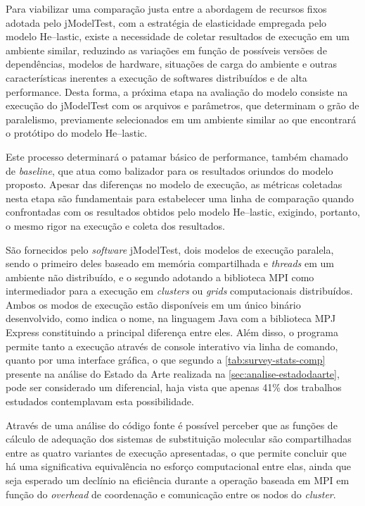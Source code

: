 \documentclass[english,brazilian]{UNISINOSmonografia} %
\begin{document}
Para viabilizar uma comparação justa entre a abordagem de recursos fixos adotada pelo jModelTest, com a estratégia de elasticidade empregada pelo modelo \textsf{He}--lastic, existe a necessidade de coletar resultados de execução em um ambiente similar, reduzindo as variações em função de possíveis versões de dependências, modelos de hardware, situações de carga do ambiente e outras características inerentes a execução de softwares distribuídos e de alta performance.
Desta forma, a próxima etapa na avaliação do modelo consiste na execução do jModelTest com os arquivos e parâmetros, que determinam o grão de paralelismo, previamente selecionados em um ambiente similar ao que encontrará o protótipo do modelo \textsf{He}--lastic.


Este processo determinará o patamar básico de performance, também chamado de \textit{baseline}, que atua como balizador para os resultados oriundos do modelo proposto.
Apesar das diferenças no modelo de execução, as métricas coletadas nesta etapa são fundamentais para estabelecer uma linha de comparação quando confrontadas com os resultados obtidos pelo modelo \textsf{He}--lastic, exigindo, portanto, o mesmo rigor na execução e coleta dos resultados.


São fornecidos pelo \textit{software} jModelTest, dois modelos de execução paralela, sendo o primeiro deles baseado em memória compartilhada e \textit{threads} em um ambiente não distribuído, e o segundo adotando a biblioteca MPI como intermediador para a execução em \textit{clusters} ou \textit{grids} computacionais distribuídos.
Ambos os modos de execução estão disponíveis em um único binário desenvolvido, como indica o nome, na linguagem Java com a biblioteca MPJ Express \cite{Baker2006} constituindo a principal diferença entre eles.
Além disso, o programa permite tanto a execução através de console interativo via linha de comando, quanto por uma interface gráfica, o que segundo a \autoref{tab:survey-stats-comp} presente na análise do Estado da Arte realizada na \autoref{sec:analise-estadodaarte}, pode ser considerado um diferencial, haja vista que apenas 41\% dos trabalhos estudados contemplavam esta possibilidade.


Através de uma análise do código fonte é possível perceber que as funções de cálculo de adequação dos sistemas de substituição molecular são compartilhadas entre as quatro variantes de execução apresentadas, o que permite concluir que há uma significativa equivalência no esforço computacional entre elas, ainda que seja esperado um declínio na eficiência durante a operação baseada em MPI em função do \textit{overhead} de coordenação e comunicação entre os nodos do \textit{cluster}.
\end{document}

